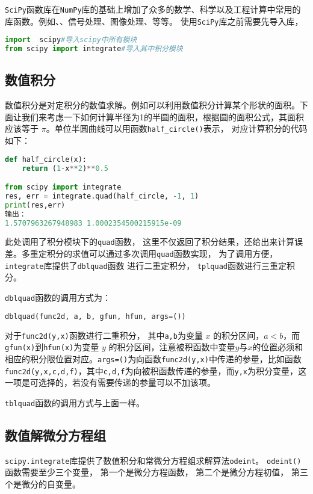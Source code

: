 
\verb|SciPy|函数库在\verb|NumPy|库的基础上增加了众多的数学、科学以及工程计算中常用的库函数。例如、、信号处理、图像处理、等等。
使用\verb|SciPy|库之前需要先导入库，
\begin{lstlisting}[language=python]
import  scipy#导入scipy中所有模块
from scipy import integrate#导入其中积分模块
\end{lstlisting}
\subsection{数值积分}
数值积分是对定积分的数值求解。例如可以利用数值积分计算某个形状的面积。下面让我们来考虑一下如何计算半径为1的半圆的面积，根据圆的面积公式，其面积应该等于 $\pi$。单位半圆曲线可以用函数\verb|half_circle()|表示， 对应计算积分的代码如下：
\begin{lstlisting}[language=python]
def half_circle(x):
    return (1-x**2)**0.5

from scipy import integrate
res, err = integrate.quad(half_circle, -1, 1)
print(res,err)
输出：
1.5707963267948983 1.0002354500215915e-09
\end{lstlisting}
此处调用了积分模块下的\verb|quad|函数， 这里不仅返回了积分结果，还给出来计算误差。多重定积分的求值可以通过多次调用\verb|quad|函数实现， 为了调用方便， \verb|integrate|库提供了\verb|dblquad|函数
进行二重定积分， \verb|tplquad|函数进行三重定积分。

\verb|dblquad|函数的调用方式为：
\begin{lstlisting}[language=python]
dblquad(func2d, a, b, gfun, hfun, args=())
\end{lstlisting}
对于\verb|func2d(y,x)|函数进行二重积分， 其中\verb|a,b|为变量 $x$ 的积分区间，$ a < b $，而\verb|gfun(x)|到\verb|hfun(x)|为变量 $y$ 的积分区间，注意被积函数中变量$ y $与$ x $的位置必须和相应的积分限位置对应。\verb|args=()|为向函数\verb|func2d(y,x)|中传递的参量，比如函数\verb|func2d(y,x,c,d,f)|，其中\verb|c,d,f|为向被积函数传递的参量，而\verb|y,x|为积分变量，这一项是可选择的，若没有需要传递的参量可以不加该项。

\verb|tblquad|函数的调用方式与上面一样。

\subsection{数值解微分方程组}
\verb|scipy.integrate|库提供了数值积分和常微分方程组求解算法\verb|odeint|。
\verb|odeint()|函数需要至少三个变量， 第一个是微分方程函数， 第二个是微分方程初值， 第三个是微分的自变量。

